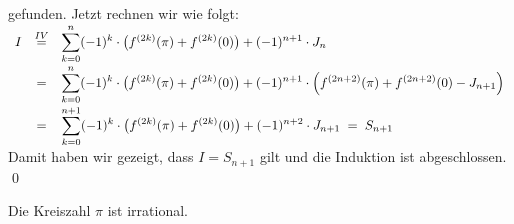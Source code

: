 \begin{enumerate}
     gefunden.  Jetzt rechnen wir wie folgt:
     \\[0.2cm]
     \hspace*{0.0cm}
     $
     \begin{array}[t]{lcl}
      I & \stackrel{IV}{=} & \displaystyle
          \sum\limits_{k=0}^n (-1)^k \cdot \bigl(f^{(2k)}(\pi) + f^{(2k)}(0)\bigr) + (-1)^{n+1} \cdot J_n 
             \\[0.4cm]
        & = & \displaystyle
         \sum\limits_{k=0}^n (-1)^k \cdot \bigl(f^{(2k)}(\pi) + f^{(2k)}(0)\bigr) + (-1)^{n+1} \cdot \Bigl( f^{(2n+2)}(\pi) + f^{(2n+2)}(0) - J_{n+1} \Bigr)
            \\[0.4cm]
        & = & \displaystyle
            \sum\limits_{k=0}^{n+1} (-1)^k \cdot \bigl(f^{(2k)}(\pi) + f^{(2k)}(0)\bigr) + (-1)^{n+2} \cdot J_{n+1} \; = \;S_{n+1} 
     \end{array}
     $
     \\[0.2cm]
     Damit haben wir gezeigt, dass $I = S_{n+1}$ gilt und die Induktion ist abgeschlossen. \qed
\end{enumerate}


\begin{Theorem}
  Die Kreiszahl $\pi$ ist irrational.
\end{Theorem}

